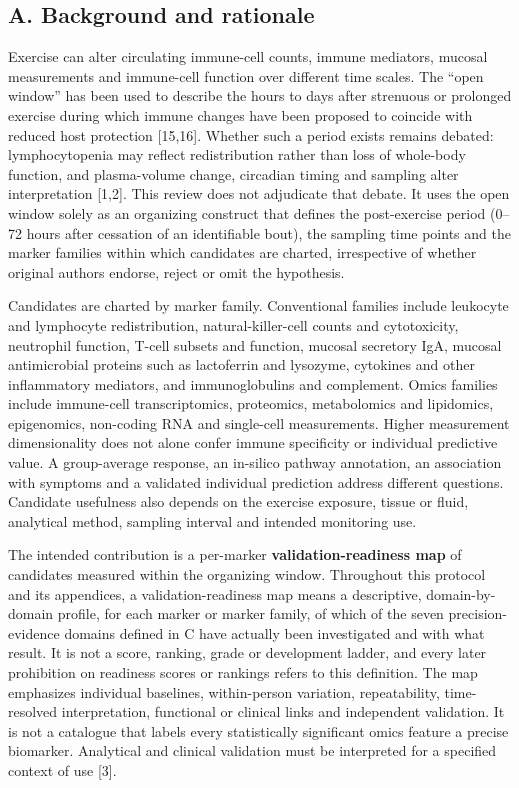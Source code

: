 \documentclass[
  11pt,
  a4paper,
]{article}
\begin{document}
\subsection{A. Background and
rationale}\label{a.-background-and-rationale}

Exercise can alter circulating immune-cell counts, immune mediators,
mucosal measurements and immune-cell function over different time
scales. The ``open window'' has been used to describe the hours to days
after strenuous or prolonged exercise during which immune changes have
been proposed to coincide with reduced host protection {[}15,16{]}.
Whether such a period exists remains debated: lymphocytopenia may
reflect redistribution rather than loss of whole-body function, and
plasma-volume change, circadian timing and sampling alter interpretation
{[}1,2{]}. This review does not adjudicate that debate. It uses the open
window solely as an organizing construct that defines the post-exercise
period (0--72 hours after cessation of an identifiable bout), the
sampling time points and the marker families within which candidates are
charted, irrespective of whether original authors endorse, reject or
omit the hypothesis.

Candidates are charted by marker family. Conventional families include
leukocyte and lymphocyte redistribution, natural-killer-cell counts and
cytotoxicity, neutrophil function, T-cell subsets and function, mucosal
secretory IgA, mucosal antimicrobial proteins such as lactoferrin and
lysozyme, cytokines and other inflammatory mediators, and
immunoglobulins and complement. Omics families include immune-cell
transcriptomics, proteomics, metabolomics and lipidomics, epigenomics,
non-coding RNA and single-cell measurements. Higher measurement
dimensionality does not alone confer immune specificity or individual
predictive value. A group-average response, an in-silico pathway
annotation, an association with symptoms and a validated individual
prediction address different questions. Candidate usefulness also
depends on the exercise exposure, tissue or fluid, analytical method,
sampling interval and intended monitoring use.

The intended contribution is a per-marker \textbf{validation-readiness
map} of candidates measured within the organizing window. Throughout
this protocol and its appendices, a validation-readiness map means a
descriptive, domain-by-domain profile, for each marker or marker family,
of which of the seven precision-evidence domains defined in C have
actually been investigated and with what result. It is not a score,
ranking, grade or development ladder, and every later prohibition on
readiness scores or rankings refers to this definition. The map
emphasizes individual baselines, within-person variation, repeatability,
time-resolved interpretation, functional or clinical links and
independent validation. It is not a catalogue that labels every
statistically significant omics feature a precise biomarker. Analytical
and clinical validation must be interpreted for a specified context of
use {[}3{]}.
\end{document}
